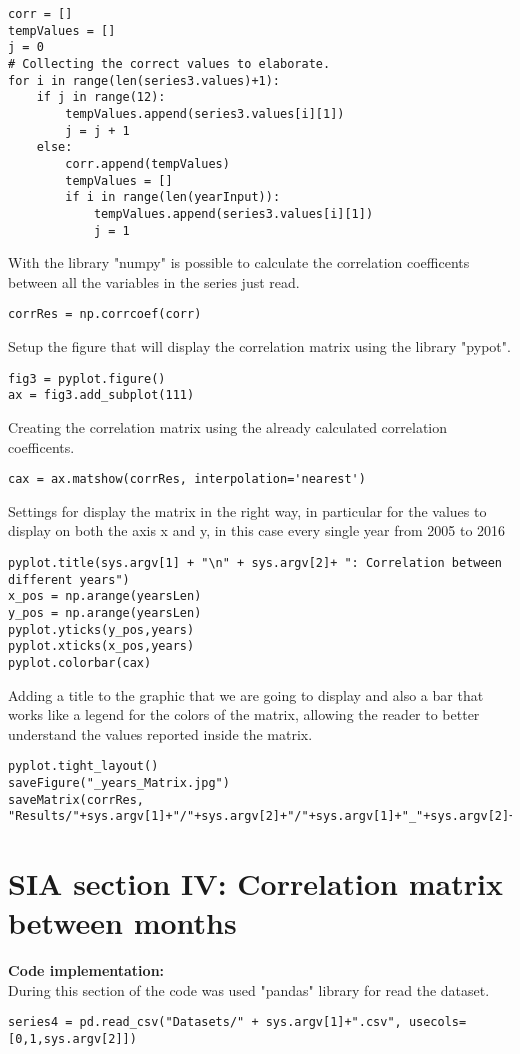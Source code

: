 \begin{lstlisting}
corr = []
tempValues = []
j = 0
# Collecting the correct values to elaborate.
for i in range(len(series3.values)+1):
	if j in range(12):
		tempValues.append(series3.values[i][1])
		j = j + 1
	else:
		corr.append(tempValues)
		tempValues = []
		if i in range(len(yearInput)):
			tempValues.append(series3.values[i][1])
			j = 1
\end{lstlisting}

With the library "numpy" is possible to calculate the correlation coefficents between all the variables in the series just read.
\begin{lstlisting}
corrRes = np.corrcoef(corr)
\end{lstlisting}

Setup the figure that will display the correlation matrix using the library "pypot".
\begin{lstlisting}
fig3 = pyplot.figure()
ax = fig3.add_subplot(111)
\end{lstlisting}

Creating the correlation matrix using the already calculated correlation coefficents.
\begin{lstlisting}
cax = ax.matshow(corrRes, interpolation='nearest')
\end{lstlisting}

Settings for display the matrix in the right way, in particular for the values to display on both the axis x and y, in this case every single year from 2005 to 2016
\begin{lstlisting}
pyplot.title(sys.argv[1] + "\n" + sys.argv[2]+ ": Correlation between different years")
x_pos = np.arange(yearsLen)
y_pos = np.arange(yearsLen)
pyplot.yticks(y_pos,years)
pyplot.xticks(x_pos,years)
pyplot.colorbar(cax)
\end{lstlisting}
\newpage
Adding a title to the graphic that we are going to display and also a bar that works like a legend for the colors of the matrix, allowing the reader to better understand the values reported inside the matrix.
\begin{lstlisting}
pyplot.tight_layout()
saveFigure("_years_Matrix.jpg")
saveMatrix(corrRes, "Results/"+sys.argv[1]+"/"+sys.argv[2]+"/"+sys.argv[1]+"_"+sys.argv[2]+"_years_CorrCoeff.csv")

\end{lstlisting}


\section{SIA section IV: Correlation matrix between months}
\label{SIA_section_IV}
\textbf{Code implementation:}\\
During this section of the code was used "pandas" library for read the dataset.
\begin{lstlisting}
series4 = pd.read_csv("Datasets/" + sys.argv[1]+".csv", usecols=[0,1,sys.argv[2]])
\end{lstlisting}

